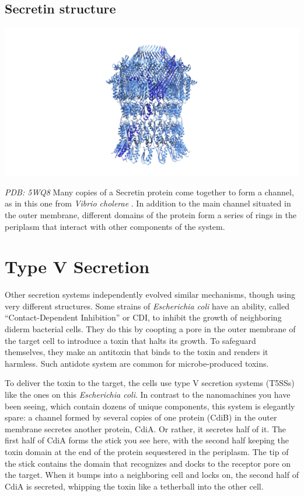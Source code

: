 \documentclass[]{tufte-book}
\begin{document}
\hypertarget{Secretin_structure}{%
\subsection{Secretin structure}\label{Secretin_structure}}

\includegraphics{img/schematics/9_4_2}

\emph{PDB: 5WQ8}
Many copies of a Secretin protein come together to form a channel, as in this one from \emph{Vibrio cholerae} \citep{yan2017a}. In addition to the main channel situated in the outer membrane, different domains of the protein form a series of rings in the periplasm that interact with other components of the system.

\hypertarget{type-v-secretion}{%
\section{Type V Secretion}\label{type-v-secretion}}

Other secretion systems independently evolved similar mechanisms, though using very different structures. Some strains of \emph{Escherichia coli} have an ability, called ``Contact-Dependent Inhibition'' or CDI, to inhibit the growth of neighboring diderm bacterial cells. They do this by coopting a pore in the outer membrane of the target cell to introduce a toxin that halts its growth. To safeguard themselves, they make an antitoxin that binds to the toxin and renders it harmless. Such antidote system are common for microbe-produced toxins.

To deliver the toxin to the target, the cells use type V secretion systems (T5SSs) like the ones on this \emph{Escherichia coli}. In contrast to the nanomachines you have been seeing, which contain dozens of unique components, this system is elegantly spare: a channel formed by several copies of one protein (CdiB) in the outer membrane secretes another protein, CdiA. Or rather, it secretes half of it. The first half of CdiA forms the stick you see here, with the second half keeping the toxin domain at the end of the protein sequestered in the periplasm. The tip of the stick contains the domain that recognizes and docks to the receptor pore on the target. When it bumps into a neighboring cell and locks on, the second half of CdiA is secreted, whipping the toxin like a tetherball into the other cell.
\end{document}
